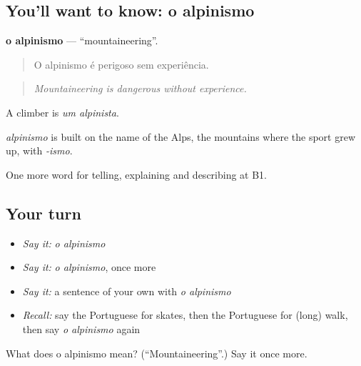 \subsection*{You'll want to know: o alpinismo}
\textbf{o alpinismo} — \textquotedblleft{}mountaineering\textquotedblright{}.

\begin{quote}
O alpinismo é perigoso sem experiência.
\end{quote}

\begin{quote}
\emph{Mountaineering is dangerous without experience.}
\end{quote}

A climber is \emph{um alpinista}.

\begin{cousinweb}
\emph{alpinismo} is built on the name of the Alps, the mountains where the sport grew up, with \emph{-ismo}.
\end{cousinweb}

\begin{grammarlens}[title={What you've built}]
One more word for telling, explaining and describing at B1.
\end{grammarlens}

\subsection*{Your turn}
\begin{itemize}
\raggedright
  \item \emph{Say it:} \emph{o alpinismo}
  \item \emph{Say it:} \emph{o alpinismo}, once more
  \item \emph{Say it:} a sentence of your own with \emph{o alpinismo}
  \item \emph{Recall:} say the Portuguese for skates, then the Portuguese for (long) walk, then say \emph{o alpinismo} again
\end{itemize}

\begin{tcolorbox}[breakable,colback=teal!4,colframe=teal!35!black,title={Before you move on}]
What does o alpinismo mean? (\textquotedblleft{}Mountaineering\textquotedblright{}.) Say it once more.
\end{tcolorbox}
